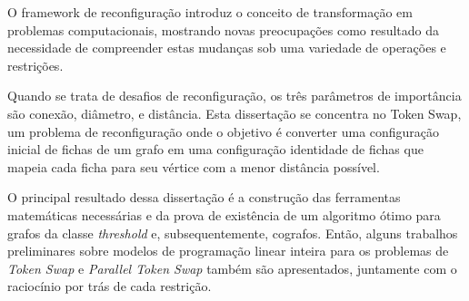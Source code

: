 O framework de reconfiguração introduz o conceito de
transformação em problemas computacionais, mostrando 
novas preocupações como resultado da necessidade de
compreender estas mudanças sob uma variedade de operações 
e restrições.

Quando se trata de desafios de reconfiguração, os
três parâmetros de importância são conexão, diâmetro, 
e distância. 
Esta dissertação se concentra no Token Swap, um problema 
de reconfiguração onde o objetivo é converter uma 
configuração inicial de fichas de um grafo em uma 
configuração identidade de fichas que mapeia cada ficha 
para seu vértice com a menor distância possível.

O principal resultado dessa dissertação é a construção das 
ferramentas matemáticas necessárias e da prova de existência 
de um algoritmo ótimo para grafos da classe \textit{threshold} 
e, subsequentemente, cografos. 
Então, alguns trabalhos preliminares sobre modelos de 
programação linear inteira para os problemas de \textit{Token Swap} 
e \textit{Parallel Token Swap} também são apresentados, juntamente 
com o raciocínio por trás de cada restrição.

